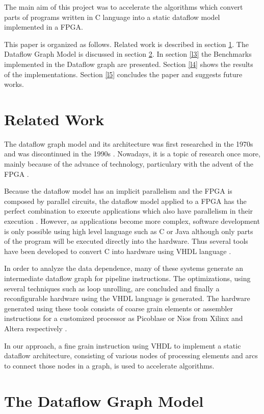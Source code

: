 \documentclass[preprint,12pt]{elsarticle}
\begin{document}
The main aim of this project was to accelerate the algorithms which convert parts of programs written in C language into a static dataflow model implemented in a FPGA.

This paper is organized as follows. Related work is described in section \ref{l1}. The Dataflow Graph Model is discussed in section \ref{l2}. In section \ref{l3} the Benchmarks implemented in the Dataflow graph are presented. Section \ref{l4} shows the results of the implementations. Section \ref{l5} concludes the paper and suggests future works.


\section{Related Work} \label{l1}

The dataflow graph model and its architecture was first researched in the 1970s and was discontinued in the 1990s \cite{r5,r22,r71,r72}. Nowadays, it is a topic of research once more, mainly because of the advance of technology, particulary with the advent of the FPGA \cite{r12,r71,r82}.

Because the dataflow model has an implicit parallelism and the FPGA is composed by parallel circuits, the dataflow model applied to a FPGA has the perfect combination to execute applications which also have parallelism in their execution \cite{r71}. However, as applications become more complex, software development is only possible using high level language such as C or Java \cite{r14} although only parts of the program will be executed directly into the hardware. Thus several tools have been developed to convert C into hardware using VHDL language \cite{r37,r64,r66}.

In order to analyze the data dependence, many of these systems generate an intermediate dataflow graph for pipeline instructions. The optimizations, using several techniques such as loop unrolling, are concluded and finally a reconfigurable hardware using the VHDL language is generated. The hardware generated using these tools consists of coarse grain elements or  assembler instructions for a customized processor as Picoblase or Nios from Xilinx and Altera respectively \cite{r84}.

In our approach, a fine grain instruction using VHDL to implement a static dataflow architecture, consisting of various nodes of processing elements and arcs to connect those nodes in a graph, is used to accelerate algorithms.

\section{The Dataflow Graph Model}\label{l2}
\end{document}

